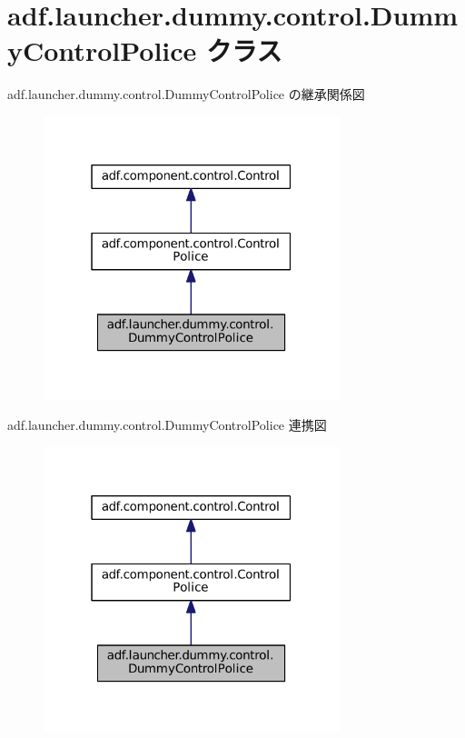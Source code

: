 \hypertarget{classadf_1_1launcher_1_1dummy_1_1control_1_1DummyControlPolice}{}\section{adf.\+launcher.\+dummy.\+control.\+Dummy\+Control\+Police クラス}
\label{classadf_1_1launcher_1_1dummy_1_1control_1_1DummyControlPolice}


adf.\+launcher.\+dummy.\+control.\+Dummy\+Control\+Police の継承関係図
\nopagebreak
\begin{figure}[H]
\begin{center}
\leavevmode
\includegraphics[width=244pt]{classadf_1_1launcher_1_1dummy_1_1control_1_1DummyControlPolice__inherit__graph}
\end{center}
\end{figure}


adf.\+launcher.\+dummy.\+control.\+Dummy\+Control\+Police 連携図
\nopagebreak
\begin{figure}[H]
\begin{center}
\leavevmode
\includegraphics[width=244pt]{classadf_1_1launcher_1_1dummy_1_1control_1_1DummyControlPolice__coll__graph}
\end{center}
\end{figure}
